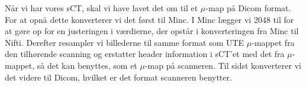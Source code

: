 Når vi har vores sCT, skal vi have lavet det om til et $\mu$-map
på Dicom format. For at opnå dette konverterer vi det først til
Minc. I Minc lægger vi 2048 til for at gøre op for en justeringen i
værdierne, der opstår i konverteringen fra Minc til Nifti. Derefter
resampler vi billederne til samme format som UTE $\mu$-mappet fra den
tilhørende scanning og erstatter header information i sCT'et med det fra
$\mu$-mappet, så det kan benyttes, som et $\mu$-map på scanneren. Til
sidst konverterer vi det videre til Dicom, hvilket er det format scanneren benytter.

